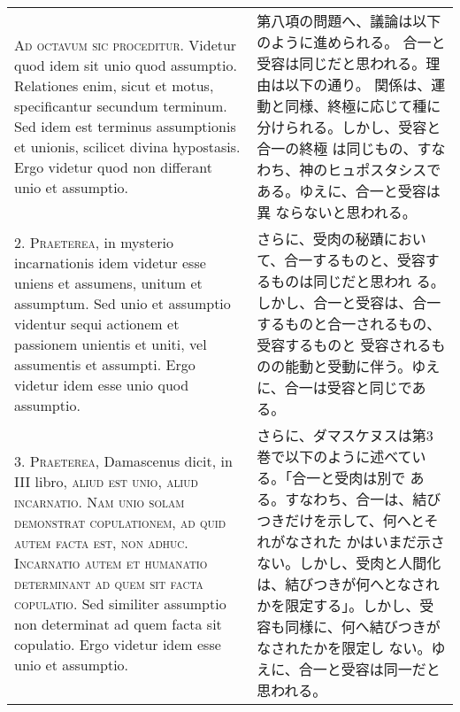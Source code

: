 \documentclass[10pt]{jsarticle} %
\begin{document}
\begin{longtable}{p{21em}p{21em}}




{\Huge A}{\scshape d octavum sic proceditur}. Videtur quod idem sit unio quod
assumptio. Relationes enim, sicut et motus, specificantur secundum
terminum. Sed idem est terminus assumptionis et unionis, scilicet divina
hypostasis. Ergo videtur quod non differant unio et assumptio.


&

第八項の問題へ、議論は以下のように進められる。
合一と受容は同じだと思われる。理由は以下の通り。
関係は、運動と同様、終極に応じて種に分けられる。しかし、受容と合一の終極
 は同じもの、すなわち、神のヒュポスタシスである。ゆえに、合一と受容は異
 ならないと思われる。


\\



2. {\scshape Praeterea}, in mysterio incarnationis idem videtur esse uniens et
assumens, unitum et assumptum. Sed unio et assumptio videntur sequi
actionem et passionem unientis et uniti, vel assumentis et
assumpti. Ergo videtur idem esse unio quod assumptio.


&


さらに、受肉の秘蹟において、合一するものと、受容するものは同じだと思われ
 る。しかし、合一と受容は、合一するものと合一されるもの、受容するものと
 受容されるものの能動と受動に伴う。ゆえに、合一は受容と同じである。

\\



3. {\scshape Praeterea}, Damascenus dicit, in III libro, {\scshape aliud est unio, aliud
incarnatio. Nam unio solam demonstrat copulationem, ad quid autem facta
est, non adhuc. Incarnatio autem et humanatio determinant ad quem sit
facta copulatio}. Sed similiter assumptio non determinat ad quem facta
sit copulatio. Ergo videtur idem esse unio et assumptio.


&


さらに、ダマスケヌスは第3巻で以下のように述べている。「合一と受肉は別で
 ある。すなわち、合一は、結びつきだけを示して、何へとそれがなされた
 かはいまだ示さない。しかし、受肉と人間化は、結びつきが何へとなされ
 かを限定する」。しかし、受容も同様に、何へ結びつきがなされたかを限定し
 ない。ゆえに、合一と受容は同一だと思われる。

\\




\end{longtable}
\end{document}
